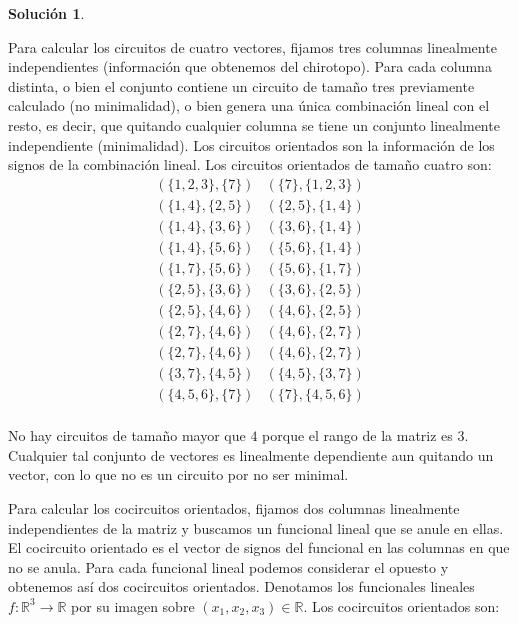 \documentclass[10pt]{article}
\theoremstyle{definition}
\newtheorem*{sol}{Solución}
\begin{document}
\begin{sol}
\begin{enumerate}[(a)]
Para calcular los circuitos de cuatro vectores, fijamos tres columnas linealmente independientes (información que obtenemos del chirotopo). Para cada columna distinta, o bien el conjunto contiene un circuito de tamaño tres previamente calculado (no minimalidad), o bien genera una única combinación lineal con el resto, es decir, que quitando cualquier columna se tiene un conjunto linealmente independiente (minimalidad). Los circuitos orientados son la información de los signos de la combinación lineal. Los circuitos orientados de tamaño cuatro son:
$$\begin{array}{cc}
(\{1,2,3\},\{7\}) & (\{7\},\{1,2,3\})\\
(\{1,4\},\{2,5\}) & (\{2,5\},\{1,4\})\\
(\{1,4\},\{3,6\}) & (\{3,6\},\{1,4\})\\
(\{1,4\},\{5,6\}) & (\{5,6\},\{1,4\})\\
(\{1,7\},\{5,6\}) & (\{5,6\},\{1,7\})\\
(\{2,5\},\{3,6\}) & (\{3,6\},\{2,5\})\\
(\{2,5\},\{4,6\}) & (\{4,6\},\{2,5\})\\
(\{2,7\},\{4,6\}) & (\{4,6\},\{2,7\})\\
(\{2,7\},\{4,6\}) & (\{4,6\},\{2,7\})\\
(\{3,7\},\{4,5\}) & (\{4,5\},\{3,7\})\\
(\{4,5,6\},\{7\}) & (\{7\},\{4,5,6\})\\
\end{array}$$


No hay circuitos de tamaño mayor que $4$ porque el rango de la matriz es $3$. Cualquier tal conjunto de vectores es linealmente dependiente aun quitando un vector, con lo que no es un circuito por no ser minimal.

Para calcular los cocircuitos orientados, fijamos dos columnas linealmente independientes de la matriz y buscamos un funcional lineal que se anule en ellas. El cocircuito orientado es el vector de signos del funcional en las columnas en que no se anula. Para cada funcional lineal podemos considerar el opuesto y obtenemos así dos cocircuitos orientados. Denotamos los funcionales lineales $f:\mathbb{R}^3\longrightarrow\mathbb{R}$ por su imagen sobre $(x_1,x_2,x_3)\in\mathbb{R}$. Los cocircuitos orientados son:


\end{enumerate}
\end{sol}
\end{document}

